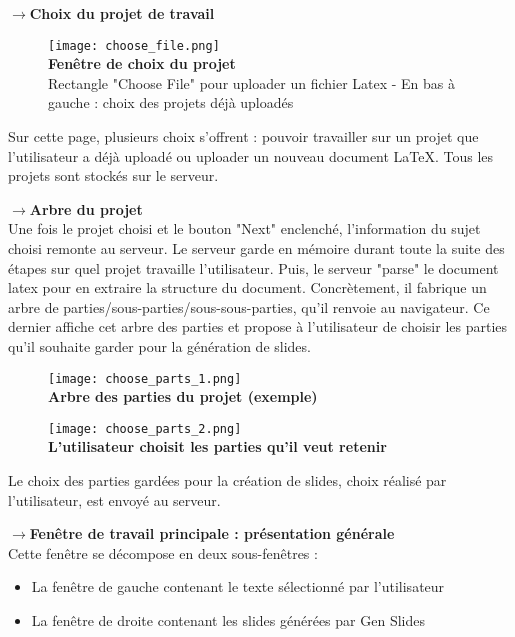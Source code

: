 \documentclass[12pt]{article}
\begin{document}
\noindent
$\longrightarrow$\textbf{Choix du projet de travail}
\begin{figure}[h!]
    \centering
    \texttt{[image: choose\_file.png]} \\
    \textbf{Fenêtre de choix du projet} \\ Rectangle "Choose File" pour uploader un fichier Latex - En bas à gauche : choix des projets déjà uploadés
\end{figure}

\noindent
Sur cette page, plusieurs choix s'offrent : pouvoir travailler sur un projet que l'utilisateur a déjà uploadé ou uploader un nouveau document LaTeX. Tous les projets sont stockés sur le serveur.


\noindent
$\longrightarrow$\textbf{Arbre du projet}\\
Une fois le projet choisi et le bouton "Next" enclenché, l'information du sujet choisi remonte au serveur. Le serveur garde en mémoire durant toute la suite des étapes sur quel projet travaille l'utilisateur. Puis, le serveur "parse" le document latex pour en extraire la structure du document. Concrètement, il fabrique un arbre de parties/sous-parties/sous-sous-parties, qu'il renvoie au navigateur. Ce dernier affiche cet arbre des parties et propose à l'utilisateur de choisir les parties qu'il souhaite garder pour la génération de slides.

\begin{figure}[h!]
    \centering
    \texttt{[image: choose\_parts\_1.png]}\\
    \textbf{Arbre des parties du projet (exemple)}
\end{figure}

\begin{figure}[h!]
    \centering
    \texttt{[image: choose\_parts\_2.png]} \\
    \textbf{L'utilisateur choisit les parties qu'il veut retenir}
\end{figure}

\noindent
Le choix des parties gardées pour la création de slides, choix réalisé par l'utilisateur, est envoyé au serveur.


\noindent
$\longrightarrow$\textbf{Fenêtre de travail principale : présentation générale}\\
Cette fenêtre se décompose en deux sous-fenêtres : 

\begin{itemize}
    \item La fenêtre de gauche contenant le texte sélectionné par l'utilisateur
    \item La fenêtre de droite contenant les slides générées par Gen Slides
\end{itemize}
\end{document}
